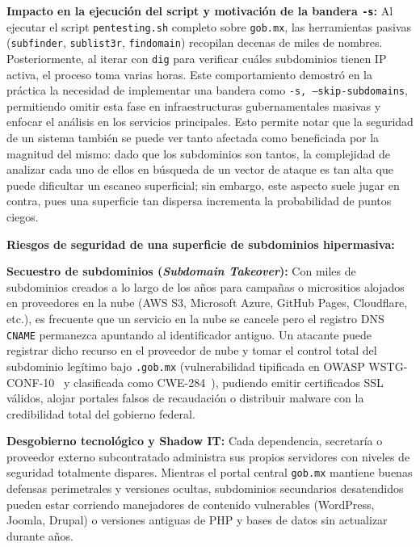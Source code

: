 \begin{itemizeColor}
\begin{itemizeColor}
        \item \textbf{Impacto en la ejecución del script y motivación de la bandera \texttt{-s}:}
        Al ejecutar el script \texttt{pentesting.sh} completo sobre \texttt{gob.mx}, las herramientas pasivas (\texttt{subfinder}, \texttt{sublist3r}, \texttt{findomain}) recopilan decenas de miles de nombres. Posteriormente, al iterar con \texttt{dig} para verificar cuáles subdominios tienen IP activa, el proceso toma varias horas. Este comportamiento demostró en la práctica la necesidad de implementar una bandera como \texttt{-s, --skip-subdomains}, permitiendo omitir esta fase en infraestructuras gubernamentales masivas y enfocar el análisis en los servicios principales. Esto permite notar que la seguridad de un sistema también se puede ver tanto afectada como beneficiada por la magnitud del mismo: dado que los subdominios son tantos, la complejidad de analizar cada uno de ellos en búsqueda de un vector de ataque es tan alta que puede dificultar un escaneo superficial; sin embargo, este aspecto suele jugar en contra, pues una superficie tan dispersa incrementa la probabilidad de puntos ciegos.      
        \item \textbf{Riesgos de seguridad de una superficie de subdominios hipermasiva:}
        \begin{enumerateColor}
            \item \textbf{Secuestro de subdominios (\textit{Subdomain Takeover}):} Con miles de subdominios creados a lo largo de los años para campañas o micrositios alojados en proveedores en la nube (AWS S3, Microsoft Azure, GitHub Pages, Cloudflare, etc.), es frecuente que un servicio en la nube se cancele pero el registro DNS \texttt{CNAME} permanezca apuntando al identificador antiguo. Un atacante puede registrar dicho recurso en el proveedor de nube y tomar el control total del subdominio legítimo bajo \texttt{.gob.mx} (vulnerabilidad tipificada en OWASP WSTG-CONF-10~\cite{owasp_wstg} y clasificada como CWE-284~\cite{cwe_284}), pudiendo emitir certificados SSL válidos, alojar portales falsos de recaudación o distribuir malware con la credibilidad total del gobierno federal.
            \item \textbf{Desgobierno tecnológico y Shadow IT:} Cada dependencia, secretaría o proveedor externo subcontratado administra sus propios servidores con niveles de seguridad totalmente dispares. Mientras el portal central \texttt{gob.mx} mantiene buenas defensas perimetrales y versiones ocultas, subdominios secundarios desatendidos pueden estar corriendo manejadores de contenido vulnerables (WordPress, Joomla, Drupal) o versiones antiguas de PHP y bases de datos sin actualizar durante años.

\end{enumerateColor}
\end{itemizeColor}
\end{itemizeColor}
